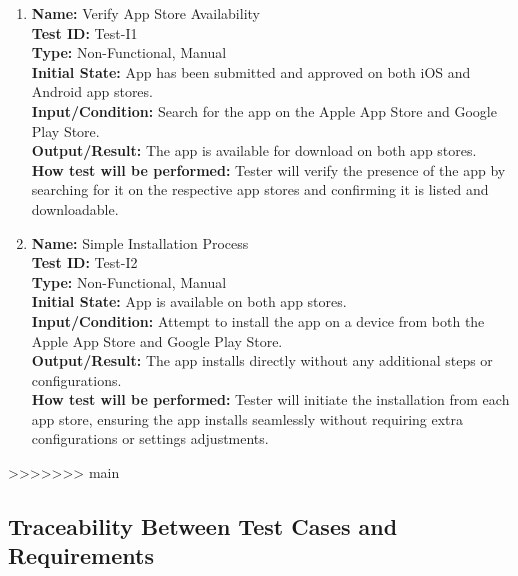 \documentclass[12pt, titlepage]{article}
\begin{document}
\begin{enumerate}
\begin{enumerate}
    \item \textbf{Name:} Verify App Store Availability \label{itm:Test-I1} \\
    \textbf{Test ID:} Test-I1 \\
    \textbf{Type:} Non-Functional, Manual \\
    \textbf{Initial State:} App has been submitted and approved on both iOS and Android app stores. \\
    \textbf{Input/Condition:} Search for the app on the Apple App Store and Google Play Store. \\
    \textbf{Output/Result:} The app is available for download on both app stores. \\
    \textbf{How test will be performed:} Tester will verify the presence of the app by searching for it on the respective app stores and confirming it is listed and downloadable.

    \item \textbf{Name:} Simple Installation Process \label{itm:Test-I2} \\
    \textbf{Test ID:} Test-I2 \\
    \textbf{Type:} Non-Functional, Manual \\
    \textbf{Initial State:} App is available on both app stores. \\
    \textbf{Input/Condition:} Attempt to install the app on a device from both the Apple App Store and Google Play Store. \\
    \textbf{Output/Result:} The app installs directly without any additional steps or configurations. \\
    \textbf{How test will be performed:} Tester will initiate the installation from each app store, ensuring the app installs seamlessly without requiring extra configurations or settings adjustments.
\end{enumerate}

>>>>>>> main

\subsection{Traceability Between Test Cases and Requirements}



\end{enumerate}
\end{document}
